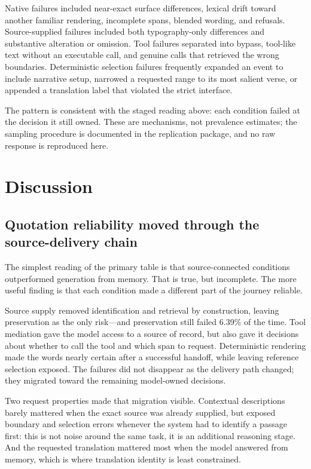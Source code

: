 \documentclass[11pt]{article}
\begin{document}
Native failures included near-exact surface differences, lexical drift toward
another familiar rendering, incomplete spans, blended wording, and refusals.
Source-supplied failures included both typography-only differences and
substantive alteration or omission. Tool failures separated into bypass,
tool-like text without an executable call, and genuine calls that retrieved the
wrong boundaries. Deterministic selection failures frequently expanded an
event to include narrative setup, narrowed a requested range to its most
salient verse, or appended a translation label that violated the strict interface.

The pattern is consistent with the staged reading above: each condition
failed at the decision it still owned. These are mechanisms, not prevalence
estimates; the sampling procedure is documented in the replication package, and
no raw response is reproduced here.

\section{Discussion}
\label{sec:discussion}

\subsection{Quotation reliability moved through the source-delivery chain}

The simplest reading of the primary table is that source-connected
conditions outperformed generation from memory. That is true, but
incomplete. The more useful finding is that each condition made a different
part of the journey reliable.

Source supply removed identification and retrieval by construction, leaving
preservation as the only risk---and preservation still failed 6.39\% of the
time. Tool mediation gave the model access to a source of record, but also
gave it decisions about whether to call the tool and which span to request.
Deterministic rendering made the words nearly certain after a successful
handoff, while leaving reference selection exposed. The failures did not
disappear as the delivery path changed; they migrated toward the remaining
model-owned decisions.

Two request properties made that migration visible. Contextual descriptions
barely mattered when the exact source was already supplied, but exposed
boundary and selection errors whenever the system had to identify a passage
first: this is not noise around the same task, it is an additional reasoning
stage. And the requested translation mattered most when the model answered from
memory, which is where translation identity is least constrained.
\end{document}
